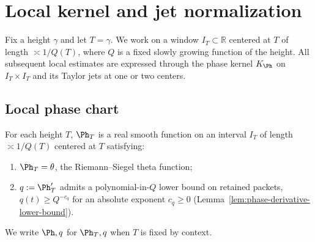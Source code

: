 %
%
%
%

\section{Local kernel and jet normalization}
\label{sec:local-kernel-and-jet-normalization}
\quad
{}\quad
{}\quad
{}\quad
{}\quad
{}
\par\medskip

Fix a height \(\gamma\) and let \(T = \gamma\).  We work on a window
\(I_T \subset \mathbb R\) centered at \(T\) of length
\(\asymp 1/Q(T)\), where \(Q\) is a fixed slowly growing function of
the height.  All subsequent local estimates are expressed through the
phase kernel \(K_\Ph\) on \(I_T\times I_T\) and its Taylor jets at
one or two centers.

\subsection{Local phase chart}
\label{subsec:local-phase-chart}

\begin{definition}
\label{def:local-phase-chart}
For each height \(T\), \(\Ph_T\) is a real smooth function on an
interval \(I_T\) of length \(\asymp 1/Q(T)\) centered at \(T\)
satisfying:
\begin{enumerate}[label=\textup{(P\arabic*)},leftmargin=*]
\item \(\Ph_T = \theta\), the Riemann--Siegel theta function;
\item \(q := \Ph_T'\) admits a polynomial-in-\(Q\) lower bound on
  retained packets, \(q(t) \ge Q^{-c_q}\) for an absolute exponent
  \(c_q \ge 0\) (Lemma~\ref{lem:phase-derivative-lower-bound}).
\end{enumerate}
We write \(\Ph,q\) for \(\Ph_T,q\) when \(T\) is fixed by context.
\end{definition}

